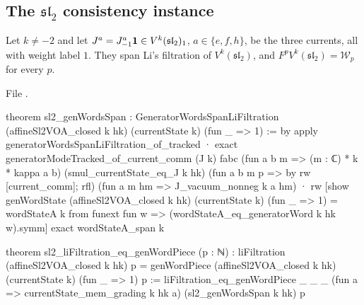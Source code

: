 \subsection{The \texorpdfstring{$\mathfrak{sl}_2$}{sl(2)} consistency instance}\label{l11:sec:genwords-sl2}

\begin{theorem}\label{l11:thm:sl2genwords}
Let $k\neq-2$ and let $J^a = J^a_{-1}\mathbf{1}\in V^k(\mathfrak{sl}_2)_1$, $a\in\{e,f,h\}$, be the three currents, all with weight
label $1$. They span Li's filtration of $V^k(\mathfrak{sl}_2)$, and $F^pV^k(\mathfrak{sl}_2) = \mathcal W_p$ for every $p$.
\end{theorem}
\noindent File .
\begin{leancode}
theorem sl2_genWordsSpan :
    GeneratorWordsSpanLiFiltration (affineSl2VOA_closed k hk) (currentState k) (fun _ => 1) := by
  apply generatorWordsSpanLiFiltration_of_tracked
  · exact generatorModeTracked_of_current_comm (J k) fabc
      (fun a b m => (m : ℂ) * k * kappa a b) (smul_currentState_eq_J k hk)
      (fun a b m p => by rw [current_comm]; rfl)
      (fun a m hm => J_vacuum_nonneg k a hm)
  · rw [show genWordState (affineSl2VOA_closed k hk) (currentState k) (fun _ => 1) =
        wordStateA k from funext fun w => (wordStateA_eq_generatorWord k hk w).symm]
    exact wordStateA_span k

theorem sl2_liFiltration_eq_genWordPiece (p : ℕ) :
    liFiltration (affineSl2VOA_closed k hk) p =
      genWordPiece (affineSl2VOA_closed k hk) (currentState k) (fun _ => 1) p :=
  liFiltration_eq_genWordPiece _ _ _ (fun a => currentState_mem_grading k hk a)
    (sl2_genWordsSpan k hk) p
\end{leancode}

